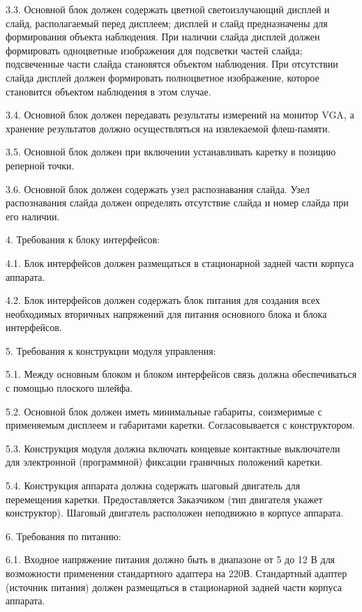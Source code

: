 3.3. Основной блок должен содержать цветной светоизлучающий дисплей и слайд, располагаемый перед дисплеем; дисплей и слайд предназначены для формирования объекта наблюдения. При наличии слайда дисплей должен формировать одноцветные изображения для подсветки частей слайда; подсвеченные части слайда становятся объектом наблюдения. При отсутствии слайда дисплей должен формировать полноцветное изображение, которое становится объектом наблюдения в этом случае.

3.4. Основной блок должен передавать результаты измерений на монитор VGA, а хранение результатов должно осуществляться на извлекаемой флеш-памяти.

3.5. Основной блок должен при включении устанавливать каретку в позицию реперной точки.

3.6. Основной блок должен содержать узел распознавания слайда. Узел распознавания слайда должен определять отсутствие слайда и номер слайда при его наличии.

4. Требования к блоку интерфейсов:

4.1. Блок интерфейсов должен размещаться в стационарной задней части корпуса аппарата.

4.2. Блок интерфейсов должен содержать блок питания для создания всех необходимых вторичных напряжений для питания основного блока и блока интерфейсов.

5. Требования к конструкции модуля управления:

5.1. Между основным блоком и блоком интерфейсов связь должна обеспечиваться с помощью плоского шлейфа.

5.2. Основной блок должен иметь минимальные габариты, соизмеримые с применяемым дисплеем и габаритами каретки. Согласовывается с конструктором.

5.3. Конструкция модуля должна включать концевые контактные выключатели для электронной (программной) фиксации граничных положений каретки.

5.4. Конструкция аппарата должна содержать шаговый двигатель для перемещения каретки. Предоставляется Заказчиком (тип двигателя укажет конструктор). Шаговый двигатель расположен неподвижно в корпусе аппарата.

6. Требования по питанию:

6.1. Входное напряжение питания должно быть в диапазоне от 5 до 12 В для возможности применения стандартного адаптера на 220В. Стандартный адаптер (источник питания) должен размещаться в стационарной задней части корпуса аппарата.

